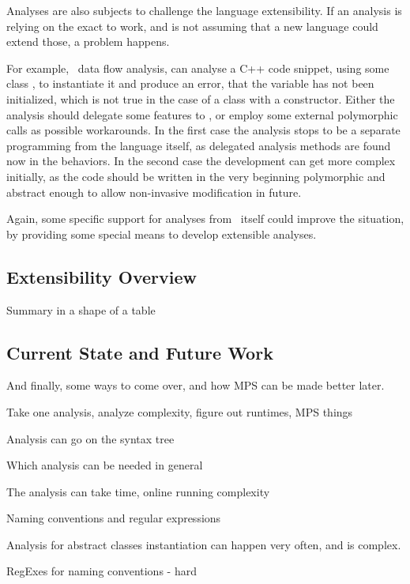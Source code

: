 Analyses are also subjects to challenge the language extensibility. If an analysis is relying on the exact 
to work, and is not assuming that a new language could extend those, a problem happens.

For example, \mbdr\ data flow analysis, can analyse a C++ code snippet, using some class , to instantiate it 
and produce an error, that the variable  has not been initialized, which is not true in the case of a class with a constructor.
Either the analysis should delegate some features to , or employ some external polymorphic calls as possible workarounds.
In the first case the analysis stops to be a separate programming from the language itself, as delegated analysis methods are found now
in the  behaviors. In the second case the development can get more complex initially, as the code should be written 
in the very beginning polymorphic and abstract enough to allow non-invasive modification in future.


Again, some specific support for analyses from \jbmps\ itself could improve the situation, by providing some special means 
to develop extensible analyses.


\subsection{Extensibility Overview}
Summary in a shape of a table


\subsection{Current State and Future Work}
And finally, some ways to come over, and how MPS can be made better later.



Take one analysis, analyze complexity, figure out runtimes, MPS things

 Analysis can go on the syntax tree

 Which analysis can be needed in general
 
 The analysis can take time, online running complexity
 
 Naming conventions and regular expressions


 Analysis for abstract classes instantiation can happen very often, and is complex.
 
 
 
 RegExes for naming conventions - hard